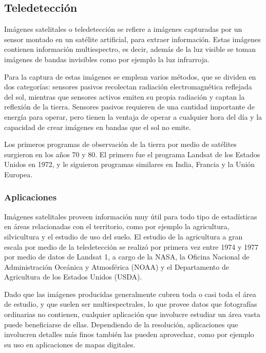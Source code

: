 \subsection{Teledetección}

Imágenes satelitales o teledetección se refiere a imágenes capturadas por un sensor montado en un satélite artificial,
para extraer información. Estas imágenes contienen información multiespectro, es decir, además de la luz visible se
toman imágenes de bandas invisibles como por ejemplo la luz infrarroja. \autocite{globalforestlink-how-sat-imaging-work}

Para la captura de estas imágenes se emplean varios métodos, que se dividen en dos categorías: sensores pasivos
recolectan radiación electromagnética reflejada del sol, mientras que sensores activos emiten su propia radiación y
captan la reflexión de la tierra. Sensores pasivos requieren de una cantidad importante de energía para operar, pero
tienen la ventaja de operar a cualquier hora del día y la capacidad de crear imágenes en bandas que el sol no emite.
\autocite{globalforestlink-how-sat-imaging-work}

Los primeros programas de observación de la tierra por medio de satélites surgieron en los años 70 y 80. El primero fue
el programa Landsat de los Estados Unidos en 1972, y le siguieron programas similares en India, Francia y la Unión
Europea. \autocite{esa-space-year-2007}

\subsubsection{Aplicaciones}

Imágenes satelitales proveen información muy útil para todo tipo de estadísticas en áreas relacionadas con el
territorio, como por ejemplo la agricultura, silvicultura y el estudio de uso del suelo. El estudio de la agricultura a
gran escala por medio de la teledetección se realizó por primera vez entre 1974 y 1977 por medio de datos de Landsat 1,
a cargo de la NASA, la Oficina Nacional de Administración Oceánica y Atmosférica (NOAA) y el Departamento de
Agricultura de los Estados Unidos (USDA). \autocite{allen-usda-study}

Dado que las imágenes producidas generalmente cubren toda o casi toda el área de estudio, y que suelen ser
multiespectrales, lo que provee datos que fotografías ordinarias no contienen, cualquier aplicación que involucre
estudiar un área vasta puede beneficiarse de ellas. Dependiendo de la resolución, aplicaciones que involucren detalles
más finos también las pueden aprovechar, como por ejemplo su uso en aplicaciones de mapas digitales.

